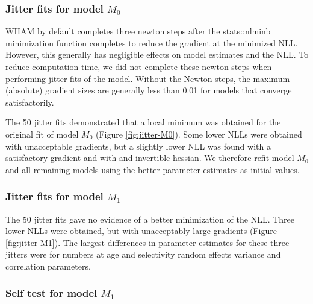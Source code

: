 \documentclass[
]{article}
\begin{document}
\hypertarget{jitter-fits-for-model-m_0}{%
\subsubsection*{\texorpdfstring{Jitter fits for model \(M_0\)}{Jitter fits for model M\_0}}\label{jitter-fits-for-model-m_0}}

WHAM by default completes three newton steps after the stats::nlminb minimization function completes to reduce the gradient at the minimized NLL. However, this generally has negligible effects on model estimates and the NLL. To reduce computation time, we did not complete these newton steps when performing jitter fits of the model. Without the Newton steps, the maximum (absolute) gradient sizes are generally less than 0.01 for models that converge satisfactorily.

The 50 jitter fits demonstrated that a local minimum was obtained for the original fit of model \(M_0\) (Figure \ref{fig:jitter-M0}). Some lower NLLs were obtained with unacceptable gradients, but a slightly lower NLL was found with a satisfactory gradient and with and invertible hessian. We therefore refit model \(M_0\) and all remaining models using the better parameter estimates as initial values.

\hypertarget{jitter-fits-for-model-m_1}{%
\subsubsection*{\texorpdfstring{Jitter fits for model \(M_1\)}{Jitter fits for model M\_1}}\label{jitter-fits-for-model-m_1}}

The 50 jitter fits gave no evidence of a better minimization of the NLL. Three lower NLLs were obtained, but with unacceptably large gradients (Figure \ref{fig:jitter-M1}). The largest differences in parameter estimates for these three jitters were for numbers at age and selectivity random effects variance and correlation parameters.

\hypertarget{self-test-for-model-m_1}{%
\subsubsection*{\texorpdfstring{Self test for model \(M_1\)}{Self test for model M\_1}}\label{self-test-for-model-m_1}}
\end{document}
